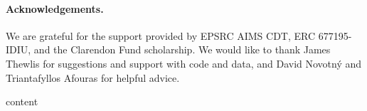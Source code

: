 \documentclass{article}
\begin{document}
\paragraph{Acknowledgements.} We are grateful for the support provided by EPSRC AIMS CDT, ERC 677195-IDIU, and the Clarendon Fund scholarship. We would like to thank James Thewlis for suggestions and support with code and data, and David Novotný and Triantafyllos Afouras for helpful advice.


\clearpage

%

\clearpage
\appendix
{content}\clearpage
\end{document}
